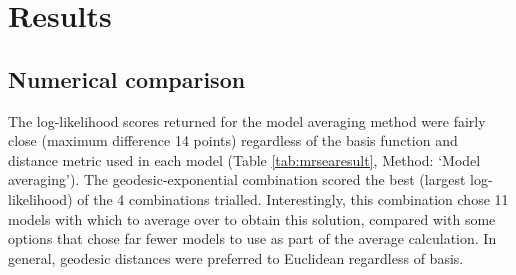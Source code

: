 \documentclass[letterpaper, 12pt]{interact}
\begin{document}
	
	
	
	
	
	
	
	\section*{Results}\label{results}
	
	
	\subsection*{Numerical comparison}\label{numerical-comparison}
	
	The log-likelihood scores returned for the model averaging method were fairly close (maximum difference 14 points) regardless of the basis function and distance metric used in each model (Table \ref{tab:mrsearesult}, Method: `Model averaging'). The geodesic-exponential combination scored the best (largest log-likelihood) of the 4 combinations trialled. Interestingly, this combination chose 11 models with which to average over to obtain this solution, compared with some options that chose far fewer models to use as part of the average calculation. In general, geodesic distances were preferred to Euclidean regardless of basis. 
	
	\vspace{1cm}
	
\end{document}
